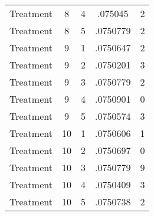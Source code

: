 \begin{tabular}{l*{4}{c}}
Treatment           &           8&           4&     .075045&           2\\
Treatment           &           8&           5&    .0750779&           2\\
Treatment           &           9&           1&    .0750647&           2\\
Treatment           &           9&           2&    .0750201&           3\\
Treatment           &           9&           3&    .0750779&           2\\
Treatment           &           9&           4&    .0750901&           0\\
Treatment           &           9&           5&    .0750574&           3\\
Treatment           &          10&           1&    .0750606&           1\\
Treatment           &          10&           2&    .0750697&           0\\
Treatment           &          10&           3&    .0750779&           9\\
Treatment           &          10&           4&    .0750409&           3\\
Treatment           &          10&           5&    .0750738&           2\\
\hline\hline
\end{tabular}
